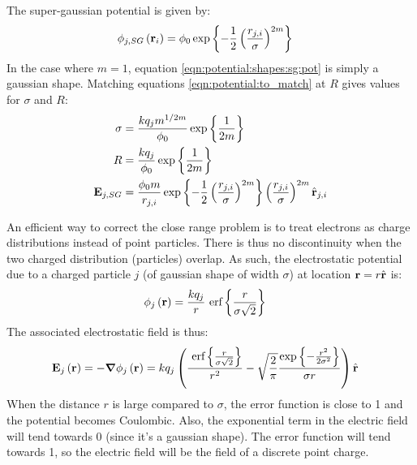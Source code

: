 The super-gaussian potential is given by:
\begin{align}
\phi_{j,SG}\left( \textbf{r}_i \right) & = \phi_0 \exp{ \left\{ 
                            -\frac{1}{2} \left( \frac{r_{j,i}}{\sigma} \right)^{2m}
                         \right\}}
\label{eqn:potential:shapes:sg:pot}
\end{align}
In the case where $m = 1$, equation \ref{eqn:potential:shapes:sg:pot} is simply
a gaussian shape. Matching equations \eqref{eqn:potential:to_match} at $R$ gives
values for $\sigma$ and $R$:
\begin{subequations}
\begin{align}
\sigma  & = \frac{k q_j m^{1/2m}}{\phi_0} \exp{ \left\{ \frac{1}{2m} \right\}} \\
R       & = \frac{k q_j}{\phi_0} \exp{ \left\{ \frac{1}{2m} \right\}} \\
\textbf{E}_{j,SG} & = \frac{\phi_0 m}{r_{j,i}}
                \exp{ \left\{ -\frac{1}{2} \left( \frac{r_{j,i}}{\sigma} \right)^{2m} \right\}}
                \left(  \frac{r_{j,i}}{\sigma}  \right)^{2m}
                \hat{\textbf{r}}_{j,i}
\end{align}
\label{eqn:potential:shapes:sg}
\end{subequations}





An efficient way to correct the close range problem is to treat electrons as
charge distributions instead of point particles. There is thus no
discontinuity when the two charged distribution (particles) overlap. As such,
the electrostatic potential due to a charged particle $j$
(of gaussian shape of width $\sigma$) at location $\textbf{r} = r \hat{\textbf{r}}$ is:
\begin{align}
\phi_{j}\left( \textbf{r} \right) & = \frac{k q_j}{r} ~\textrm{erf} \left\{\frac{r}{\sigma \sqrt{2}}\right\}
\label{eqn:md:smoothed:phi}
\end{align}
The associated electrostatic field is thus:
\begin{align}
\textbf{E}_{j}\left( \textbf{r} \right) & = -\bm{\nabla} \phi_j\left( \textbf{r} \right) = k q_j \left( 
    \frac{ ~\textrm{erf} \left\{\frac{r}{\sigma\sqrt{2}}\right\} }{r^2}
    - \sqrt{\frac{2}{\pi}} \frac{ \exp{ \left\{ -\frac{r^2}{2 \sigma^2} \right\}} }{\sigma r}
 \right) \hat{\textbf{r}}
\label{eqn:md:smoothed:E}
\end{align}
When the distance $r$ is large compared to $\sigma$, the error function
is close to 1 and the potential becomes Coulombic. Also, the exponential
term in the electric field will tend towards 0 (since it's a gaussian shape).
The error function will tend towards 1, so the electric field will
be the field of a discrete point charge.

